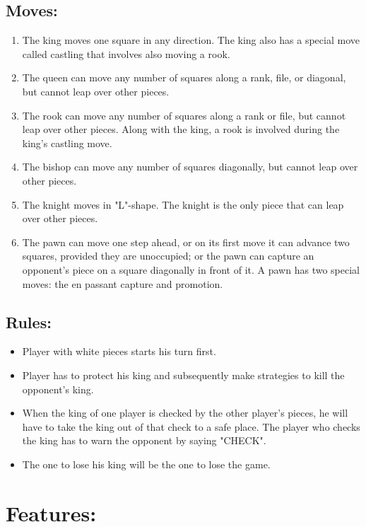 \documentclass{article}
\begin{document}
\subsection{Moves:}
\begin{enumerate}
\item {The king moves one square in any direction. The king also has a special move called castling that involves also moving a rook.}
\item {The queen can move any number of squares along a rank, file, or diagonal, but cannot leap over other pieces.}
\item {The rook can move any number of squares along a rank or file, but cannot leap over other pieces. Along with the king, a rook is involved during the king's castling move.}
\item {The bishop can move any number of squares diagonally, but cannot leap over other pieces.}
\item {The knight moves in "L"-shape. The knight is the only piece that can leap over other pieces.}
\item {The pawn can move one step ahead, or on its first move it can advance two squares, provided they are unoccupied; or the pawn can capture an opponent's piece on a square diagonally in front of it. A pawn has two special moves: the en passant capture and promotion.}
\end{enumerate}


\subsection{Rules:}
\begin{itemize}
	\item {Player with white pieces starts his turn first.}
	\item {Player has to protect his king and subsequently make strategies to kill the opponent's king. }
	\item {When the king of one player is checked by the other player's pieces, he will have to take the king out of that check to a safe place. The player who checks the king has to warn the opponent by saying "CHECK". }
	\item {The one to lose his king will be the one to lose the game.}
\end{itemize}



\section{Features:}
\end{document}

